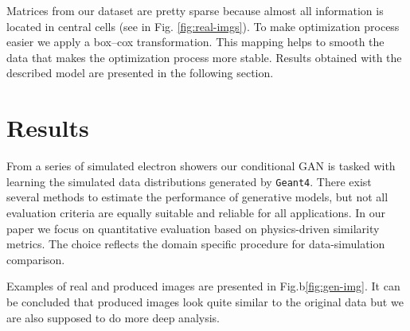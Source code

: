 \documentclass{webofc}
\begin{document}
Matrices from our dataset are pretty sparse because almost all information is located in central cells (see in Fig. \ref{fig:real-imgs}). To make optimization process easier we apply a box--cox transformation. This mapping helps to smooth the data that makes the optimization process more stable.
Results obtained with the described model are presented in the following section.

\section{Results}
From a series of simulated electron showers our conditional GAN is tasked with learning the simulated data distributions generated by \texttt{Geant4}. There exist several methods to estimate the performance of generative models, but not all evaluation criteria are equally suitable and reliable for all applications. In our paper we focus on quantitative evaluation based on physics-driven similarity metrics. The choice reflects the domain specific procedure for data-simulation comparison. 

Examples of real and produced images are presented in Fig.b\ref{fig:gen-img}. It can be concluded that produced images look quite similar to the original data but we are also supposed to do more deep analysis.
\end{document}
